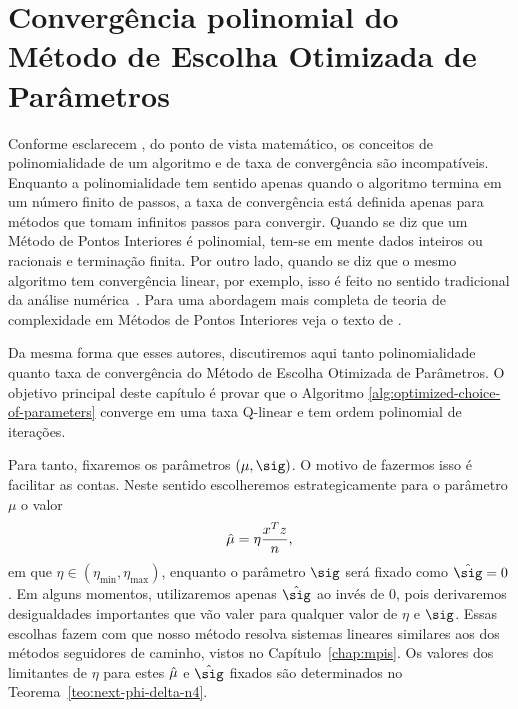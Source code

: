 




\chapter{Convergência  polinomial do Método de Escolha Otimizada de Parâmetros}


\label{chap:convergence}


Conforme esclarecem \textcite{Zhang:1993gn}, do ponto de vista matemático, os conceitos de polinomialidade de um algoritmo e de taxa de convergência são incompatíveis. Enquanto a polinomialidade tem sentido apenas quando o algoritmo termina em um número finito de passos, a taxa de convergência  está definida apenas para métodos que tomam infinitos passos para convergir. Quando  se diz que um Método de Pontos Interiores é polinomial, tem-se em mente dados inteiros ou racionais e terminação finita. Por outro lado, quando se diz que o mesmo algoritmo tem convergência linear, por exemplo, isso é feito  no sentido tradicional da análise numérica~\cite{Ortega:2000vd}. Para uma abordagem mais completa de teoria de complexidade em Métodos de Pontos Interiores veja o texto de  \textcite[cap.~3]{Wright:Primal-dual-interior-point:1997h}.

Da mesma forma que esses autores, discutiremos aqui tanto polinomialidade quanto taxa de convergência do Método de Escolha Otimizada de Parâmetros. O objetivo principal  deste capítulo é   provar  que o Algoritmo \ref{alg:optimized-choice-of-parameters} converge em uma taxa Q-linear e tem ordem polinomial de iterações.






 Para tanto,  fixaremos os parâmetros $(\mu,\sig)$. O motivo de fazermos isso é facilitar as contas. Neste sentido escolheremos estrategicamente  para o parâmetro  $\mu$ o valor \[\hat{\mu}=\eta\dfrac{x^Tz}{n},
\] 
em que $\eta\in (\eta_{\min},\eta_{\max} )$, enquanto o parâmetro $\sig$ será fixado como $\nextsig =0 $. Em alguns momentos, utilizaremos apenas $\nextsig$ ao invés de $0$, pois derivaremos desigualdades importantes que vão valer para qualquer valor de $\eta$ e $\sig$. Essas escolhas  fazem com que nosso método resolva  sistemas lineares similares aos dos métodos seguidores de caminho, vistos no Capítulo~\ref{chap:mpis}. Os valores dos limitantes de $\eta$ para  estes $\hat{\mu}$  e $\nextsig$ fixados são determinados no Teorema~\ref{teo:next-phi-delta-n4}.



